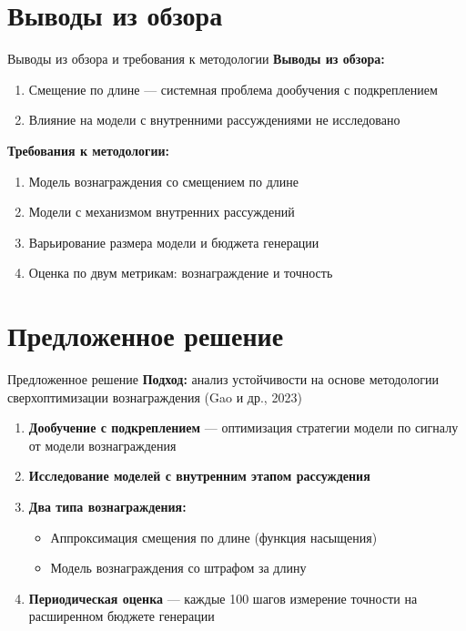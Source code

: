 \section{Выводы из обзора}
\begin{frame}{Выводы из обзора и требования к методологии}
    \textbf{Выводы из обзора:}
    \begin{enumerate}
        \item Смещение по длине --- системная проблема дообучения с подкреплением
        \item Влияние на модели с внутренними рассуждениями не исследовано
    \end{enumerate}
    
    \vspace{0.4cm}
    \textbf{Требования к методологии:}
    \begin{enumerate}
        \item Модель вознаграждения со смещением по длине
        \item Модели с механизмом внутренних рассуждений
        \item Варьирование размера модели и бюджета генерации
        \item Оценка по двум метрикам: вознаграждение и точность
    \end{enumerate}
\end{frame}

\section{Предложенное решение}
\begin{frame}{Предложенное решение}
    \textbf{Подход:} анализ устойчивости на основе методологии 
    сверхоптимизации вознаграждения (Gao и др., 2023)
    
    \vspace{0.3cm}
    \begin{enumerate}
        \item \textbf{Дообучение с подкреплением} ---
              оптимизация стратегии модели по сигналу от модели вознаграждения
        \item \textbf{Исследование моделей с внутренним этапом рассуждения} 
        \item \textbf{Два типа вознаграждения:}
              \begin{itemize}
                  \item Аппроксимация смещения по длине (функция насыщения)
                  \item Модель вознаграждения со штрафом за длину
              \end{itemize}
        \item \textbf{Периодическая оценка} --- каждые 100 шагов 
              измерение точности на расширенном бюджете генерации
    \end{enumerate}
\end{frame}

